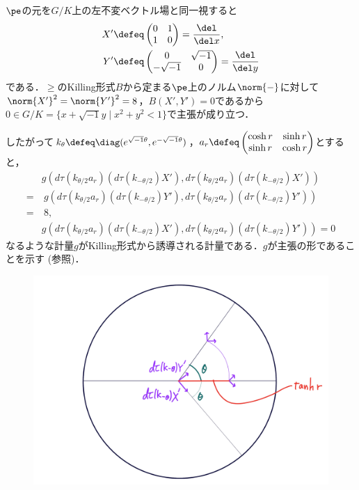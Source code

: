 \begin{npfwn}
  
  $\pe$の元を$G/K$上の左不変ベクトル場と同一視すると
  \begin{align*}
    X' &\defeq 
         \begin{pmatrix}
           0 & 1 \\ 1 & 0
         \end{pmatrix} = \dfrac{\del}{\del x},\\
    Y' &\defeq 
         \begin{pmatrix}
           0 & \sqrt{-1} \\ -\sqrt{-1} & 0
         \end{pmatrix} = \dfrac{\del}{\del y}
  \end{align*}
  である．$\ge$のKilling形式$B$から定まる$\pe$上のノルム$\norm{-} $に対して$\norm{X'}^2 = \norm{Y'}^2 = 8 $，$B(X', Y' ) = 0$であるから$0\in G/K =\{x+\sqrt{-1}y\mid x^2 + y^2 < 1 \}  $で主張が成り立つ．

  したがって$k_{\theta} \defeq \diag(e^{\sqrt{-1}\theta},e^{-\sqrt{-1}\theta}) $，$a_r\defeq
  \begin{pmatrix}
    \cosh r & \sinh r \\  \sinh r & \cosh r
  \end{pmatrix}
  $とすると，
  \begin{align*}
    &g(d\tau(k_{\theta/2}a_r)(d\tau(k_{-\theta/2})X'), d\tau(k_{\theta/2}a_r)(d\tau(k_{-\theta/2})X')) \\
    =&\ g (d\tau(k_{\theta/2}a_r)(d\tau(k_{-\theta/2})Y'), d\tau(k_{\theta/2}a_r)(d\tau(k_{-\theta/2})Y')) \\
    =&\ 8, \\
    &g(d\tau(k_{\theta/2}a_r)(d\tau(k_{-\theta/2})X'), d\tau(k_{\theta/2}a_r)(d\tau(k_{-\theta/2})Y'))  = 0
  \end{align*}
  なるような計量$g $がKilling形式から誘導される計量である．$g$が主張の形であることを示す (参照)．

  \begin{figure}[H]
    \centering
    \includegraphics[scale=0.08]{../graph/riem-su11.png}
    \caption{}
    \label{fig:riem-metric-su11}
  \end{figure}



\end{npfwn}
